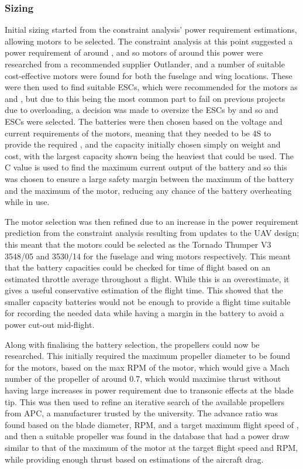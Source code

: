 \documentclass[../../main.tex]{subfiles}
\begin{document}
\subsubsection{Sizing} \label{sec:design-process:preliminary-design:propulsion:sizing}

Initial sizing started from the constraint analysis' power requirement estimations, allowing motors to be selected.
The constraint analysis at this point suggested a power requirement of around , and so motors of around this power were researched from a recommended supplier Outlander, and a number of suitable cost-effective motors were found for both the fuselage and wing locations.
These were then used to find suitable ESCs, which were recommended for the motors as  and , but due to this being the most common part to fail on previous projects due to overloading, a decision was made to oversize the ESCs by  and so  and  ESCs were selected.
The batteries were then chosen based on the voltage and current requirements of the motors, meaning that they needed to be 4S to provide the required , and the capacity initially chosen simply on weight and cost, with the largest capacity shown being the heaviest that could be used.
The C value is used to find the maximum current output of the battery and so this was chosen to ensure a large safety margin between the maximum of the battery and the maximum of the motor, reducing any chance of the battery overheating while in use. 

The motor selection was then refined due to an increase in the power requirement prediction from the constraint analysis resulting from updates to the UAV design; this meant that the motors could be selected as the Tornado Thumper V3 3548/05 and 3530/14 for the fuselage and wing motors respectively.
This meant that the battery capacities could be checked for time of flight based on an estimated  throttle average throughout a flight.
While this is an overestimate, it gives a useful conservative estimation of the flight time.
This showed that the smaller capacity batteries would not be enough to provide a flight time suitable for recording the needed data while having a margin in the battery to avoid a power cut-out mid-flight.

Along with finalising the battery selection, the propellers could now be researched.
This initially required the maximum propeller diameter to be found for the motors, based on the max RPM of the motor, which would give a Mach number of the propeller of around 0.7, which would maximise thrust without having large increases in power requirement due to transonic effects at the blade tip.
This was then used to refine an iterative search of the available propellers from APC, a manufacturer trusted by the university.
The advance ratio was found based on the blade diameter, RPM, and a target maximum flight speed of , and then a suitable propeller was found in the database that had a power draw similar to that of the maximum of the motor at the target flight speed and RPM, while providing enough thrust based on estimations of the aircraft drag.
\end{document}
